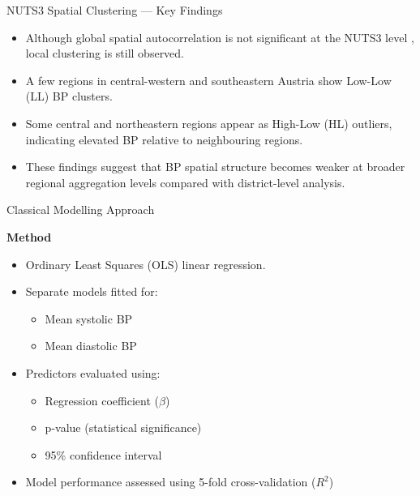 \begin{frame}{NUTS3 Spatial Clustering — Key Findings}

\small

\begin{itemize}

\item Although global spatial autocorrelation is not significant at the NUTS3 level , local clustering is still observed.

\item A few regions in central-western and southeastern Austria show Low-Low (LL) BP clusters.

\item Some central and northeastern regions appear as High-Low (HL) outliers, indicating elevated BP relative to neighbouring regions.

\item These findings suggest that BP spatial structure becomes weaker at broader regional aggregation levels compared with district-level analysis.

\end{itemize}

\end{frame}



\begin{frame}{Classical Modelling Approach}

\small

\textbf{Method}

\vspace{0.2cm}

\begin{itemize}

\item Ordinary Least Squares (OLS) linear regression.

\item Separate models fitted for:
\begin{itemize}
    \item Mean systolic BP
    \item Mean diastolic BP
\end{itemize}

\item Predictors evaluated using:
\begin{itemize}
    \item Regression coefficient ($\beta$)
    \item p-value (statistical significance)
    \item 95\% confidence interval
\end{itemize}

\item Model performance assessed using 5-fold cross-validation ($R^2$)

\end{itemize}

\vspace{0.25cm}

\footnotesize

\end{frame}


